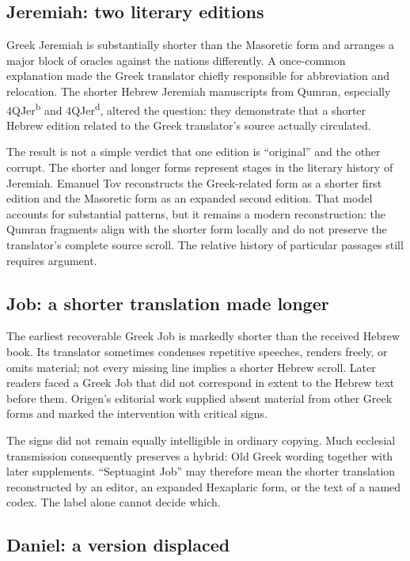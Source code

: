 \subsection{Jeremiah: two literary editions}

Greek Jeremiah is substantially shorter than the Masoretic form and arranges a major block of oracles against the nations differently. A once-common explanation made the Greek translator chiefly responsible for abbreviation and relocation. The shorter Hebrew Jeremiah manuscripts from Qumran, especially 4QJer\textsuperscript{b} and 4QJer\textsuperscript{d}, altered the question: they demonstrate that a shorter Hebrew edition related to the Greek translator's source actually circulated.

The result is not a simple verdict that one edition is ``original'' and the other corrupt. The shorter and longer forms represent stages in the literary history of Jeremiah. Emanuel Tov reconstructs the Greek-related form as a shorter first edition and the Masoretic form as an expanded second edition. That model accounts for substantial patterns, but it remains a modern reconstruction: the Qumran fragments align with the shorter form locally and do not preserve the translator's complete source scroll. The relative history of particular passages still requires argument.

\subsection{Job: a shorter translation made longer}

The earliest recoverable Greek Job is markedly shorter than the received Hebrew book. Its translator sometimes condenses repetitive speeches, renders freely, or omits material; not every missing line implies a shorter Hebrew scroll. Later readers faced a Greek Job that did not correspond in extent to the Hebrew text before them. Origen's editorial work supplied absent material from other Greek forms and marked the intervention with critical signs.

The signs did not remain equally intelligible in ordinary copying. Much ecclesial transmission consequently preserves a hybrid: Old Greek wording together with later supplements. ``Septuagint Job'' may therefore mean the shorter translation reconstructed by an editor, an expanded Hexaplaric form, or the text of a named codex. The label alone cannot decide which.

\subsection{Daniel: a version displaced}

